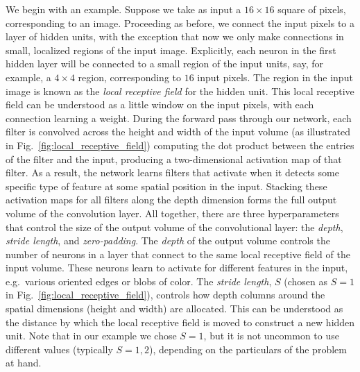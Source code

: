 \documentclass[../main.tex]{subfiles}
\begin{document}
We begin with an example.
%
Suppose we take as input a $16\times16$ square of pixels, corresponding to an image.
%
Proceeding as before, we connect the input pixels to a layer of hidden units, with the exception that now we only make
connections in small, localized regions of the input image.
%
Explicitly, each neuron in the first hidden layer will be connected to a small region of the input units, say, for
example, a $4\times4$ region, corresponding to $16$ input pixels.
%
The region in the input image is known as the \emph{local receptive field} for the hidden unit.
%
This local receptive field can be understood as a little window on the input pixels, with each connection learning a
weight.
%
%
%
During the forward pass through our network, each filter is convolved across the height and width of the input volume
(as illustrated in Fig.~\ref{fig:local_receptive_field}) computing the dot product between the entries of the filter
and the input, producing a two-dimensional activation map of that filter.
%
As a result, the network learns filters that activate when it detects some specific type of feature at some spatial
position in the input.
%
Stacking these activation maps for all filters along the depth dimension forms the full output volume of the
convolution layer.
%
All together, there are three hyperparameters that control the size of the output volume of the convolutional layer:
the \emph{depth}, \emph{stride length}, and \emph{zero-padding}.
%
The \emph{depth} of the output volume controls the number of neurons in a layer that connect to the same local
receptive field of the input volume.
%
These neurons learn to activate for different features in the input, e.g.\ various oriented edges or blobs of color.
%
The \emph{stride length}, $S$ (chosen as $S = 1$ in Fig.~\ref{fig:local_receptive_field}), controls how depth columns
around the spatial dimensions (height and width) are allocated.
%
This can be understood as the distance by which the local receptive field is moved to construct a new hidden unit.
%
Note that in our example we chose $S=1$, but it is not uncommon to use different values (typically $S = 1, 2$),
depending on the particulars of the problem at hand.
\end{document}
